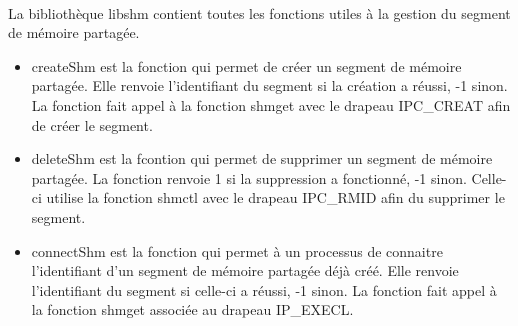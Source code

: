 \documentclass{report}
\begin{document}
			\paragraph{}
				La bibliothèque libshm contient toutes les fonctions utiles à la gestion du segment de mémoire partagée.
				\begin{itemize}
					\item createShm est la fonction qui permet de créer un segment de mémoire partagée. Elle renvoie l'identifiant du segment si la création a réussi, -1 sinon. La fonction fait appel à la fonction shmget avec le drapeau IPC\_CREAT afin de créer le segment.
					\item deleteShm est la fcontion qui permet de supprimer un segment de mémoire partagée. La fonction renvoie 1 si la suppression a fonctionné, -1 sinon. Celle-ci utilise la fonction shmctl avec le drapeau IPC\_RMID afin du supprimer le segment.
					\item connectShm est la fonction qui permet à un processus de connaitre l'identifiant d'un segment de mémoire partagée déjà créé. Elle renvoie l'identifiant du segment si celle-ci a réussi, -1 sinon. La fonction fait appel à la fonction shmget associée au drapeau IP\_EXECL.
				\end{itemize}
\end{document}
